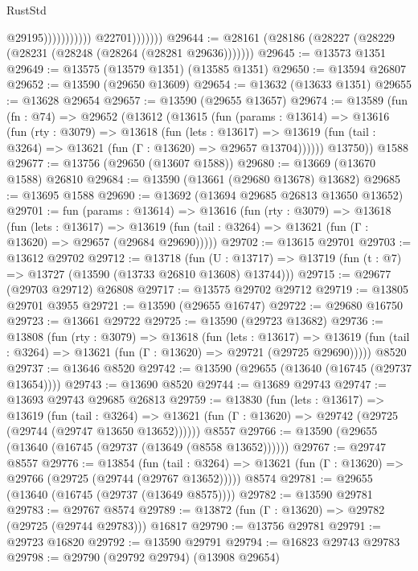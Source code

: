 \begin{lexlean}{RustStd}
\begin{coremodule}
                                        @29195)))))))))))
                  @22701)))))))
@29644 := @28161 (@28186 (@28227 (@28229 (@28231 (@28248 (@28264 (@28281 @29636)))))))
@29645 := @13573 @1351
@29649 := @13575 (@13579 @1351) (@13585 @1351)
@29650 := @13594 @26807
@29652 := @13590 (@29650 @13609)
@29654 := @13632 (@13633 @1351)
@29655 := @13628 @29654
@29657 := @13590 (@29655 @13657)
@29674 := @13589
    (fun (fn : @74) =>
    @29652
      (@13612
        (@13615
          (fun (params : @13614) =>
          @13616
            (fun (rty : @3079) =>
            @13618
              (fun (lets : @13617) =>
              @13619 (fun (tail : @3264) => @13621 (fun (Γ : @13620) => @29657 @13704))))))
        @13750))
    @1588
@29677 := @13756 (@29650 (@13607 @1588))
@29680 := @13669 (@13670 @1588) @26810
@29684 := @13590 (@13661 (@29680 @13678) @13682)
@29685 := @13695 @1588
@29690 := @13692 (@13694 @29685 @26813 @13650 @13652)
@29701 := fun (params : @13614) =>
  @13616
    (fun (rty : @3079) =>
    @13618
      (fun (lets : @13617) =>
      @13619 (fun (tail : @3264) => @13621 (fun (Γ : @13620) => @29657 (@29684 @29690)))))
@29702 := @13615 @29701
@29703 := @13612 @29702
@29712 := @13718
    (fun (U : @13717) => @13719 (fun (t : @7) => @13727 (@13590 (@13733 @26810 @13608) @13744)))
@29715 := @29677 (@29703 @29712) @26808
@29717 := @13575 @29702 @29712
@29719 := @13805 @29701 @3955
@29721 := @13590 (@29655 @16747)
@29722 := @29680 @16750
@29723 := @13661 @29722
@29725 := @13590 (@29723 @13682)
@29736 := @13808
    (fun (rty : @3079) =>
    @13618
      (fun (lets : @13617) =>
      @13619 (fun (tail : @3264) => @13621 (fun (Γ : @13620) => @29721 (@29725 @29690)))))
    @8520
@29737 := @13646 @8520
@29742 := @13590 (@29655 (@13640 (@16745 (@29737 @13654))))
@29743 := @13690 @8520
@29744 := @13689 @29743
@29747 := @13693 @29743 @29685 @26813
@29759 := @13830
    (fun (lets : @13617) =>
    @13619
      (fun (tail : @3264) =>
      @13621 (fun (Γ : @13620) => @29742 (@29725 (@29744 (@29747 @13650 @13652))))))
    @8557
@29766 := @13590 (@29655 (@13640 (@16745 (@29737 (@13649 (@8558 @13652))))))
@29767 := @29747 @8557
@29776 := @13854
    (fun (tail : @3264) => @13621 (fun (Γ : @13620) => @29766 (@29725 (@29744 (@29767 @13652)))))
    @8574
@29781 := @29655 (@13640 (@16745 (@29737 (@13649 @8575))))
@29782 := @13590 @29781
@29783 := @29767 @8574
@29789 := @13872 (fun (Γ : @13620) => @29782 (@29725 (@29744 @29783))) @16817
@29790 := @13756 @29781
@29791 := @29723 @16820
@29792 := @13590 @29791
@29794 := @16823 @29743 @29783
@29798 := @29790 (@29792 @29794) (@13908 @29654)

\end{coremodule}
\end{lexlean}
